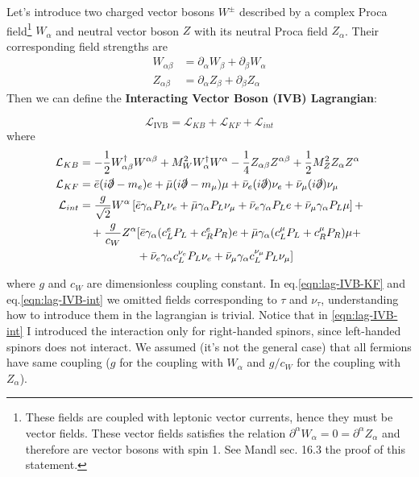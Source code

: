 \documentclass[TheoreticalPhy_ModB.tex]{subfiles}
\begin{document}
Let's introduce two charged vector bosons $W^\pm$ described by a complex Proca field\footnote{These fields are coupled with leptonic vector currents, hence they must be  vector fields. These vector fields satisfies the relation $\partial^\alpha W_\alpha=0=\partial^\alpha Z_\alpha$ and therefore are vector bosons with spin 1. See Mandl sec. 16.3 the proof of this statement.} $W_\alpha$ and neutral vector boson $Z$ with its neutral Proca field $Z_\alpha$. Their corresponding field strengths are
\begin{align*}
W_{\alpha\beta}&=\partial_\alpha W_\beta+\partial_\beta W_\alpha\\
Z_{\alpha\beta}&=\partial_\alpha Z_\beta+\partial_\beta Z_\alpha
\end{align*}
Then we can define the \textbf{Interacting Vector Boson (IVB) Lagrangian}:

\begin{mdframed}[style=mybox]
\begin{equation}
\mathcal L_{\text{IVB}}=\mathcal L_{KB}+\mathcal L_{KF}+\mathcal L_{int}
\end{equation}
where
\begin{align}
\mathcal L_{KB}&=-\frac12W^\dagger_{\alpha\beta}W^{\alpha\beta}+M_W^2W_\alpha^\dagger W^\alpha-\frac14Z_{\alpha\beta}Z^{\alpha\beta}+\frac12M_Z^2Z_\alpha Z^\alpha\label{eqn:lag-IVB-KB}\\
\mathcal L_{KF}&=\bar e(i\slashed\partial-m_e)e+\bar \mu(i\slashed\partial-m_\mu)\mu+\bar \nu_e(i\slashed\partial)\nu_e+\bar \nu_\mu(i\slashed\partial)\nu_\mu\label{eqn:lag-IVB-KF}\\
\mathcal L_{int}&=\frac g{\sqrt 2}W^\alpha\left[\bar e\gamma_\alpha P_L\nu_e+\bar \mu\gamma_\alpha P_L\nu_\mu+\bar \nu_e\gamma_\alpha P_Le+\bar \nu_\mu\gamma_\alpha P_L\mu\right] +\notag\\
&\quad+\frac g{c_W}Z^\alpha[\bar e\gamma_\alpha(c_L^eP_L+c_R^eP_R)e+\bar \mu\gamma_\alpha(c_L^\mu P_L+c_R^\mu P_R)\mu+\notag\\
&\hspace{1.8cm}+\bar\nu_e\gamma_\alpha c_L^{\nu_e}P_L\nu_e+\bar\nu_\mu\gamma_\alpha c_L^{\nu_\mu}P_L\nu_\mu]\label{eqn:lag-IVB-int}
\end{align}
\end{mdframed}
where $g$ and $c_W$ are dimensionless coupling constant. In eq.\eqref {eqn:lag-IVB-KF} and eq.\eqref{eqn:lag-IVB-int} we omitted fields corresponding to $\tau$ and $\nu_\tau$, understanding how to introduce them in the lagrangian is trivial.
Notice that in \eqref{eqn:lag-IVB-int} I introduced the interaction only for right-handed spinors, since left-handed spinors does not interact. We assumed (it's not the general case) that all fermions have same coupling ($g$ for the coupling with $W_\alpha$ and $g/c_W$ for the coupling with $Z_\alpha$). 
\end{document}
